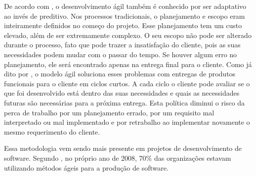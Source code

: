 De acordo com \cite{soares}, o desenvolvimento ágil também é conhecido por ser adaptativo ao invés de preditivo. Nos processos tradicionais, o planejamento e escopo eram inteiramente definidos no começo do projeto. Esse planejamento tem um custo elevado, além de ser extremamente complexo. O seu escopo não pode ser alterado durante o processo, fato que pode trazer a insatisfação do cliente, pois as suas necessidades podem mudar com o passar do tempo. Se houver algum erro no planejamento, ele será encontrado apenas na entrega final para o cliente. Como já dito por \cite{pressman2009engenharia}, o modelo ágil soluciona esses problemas com entregas de produtos funcionais para o cliente em ciclos curtos. A cada ciclo o cliente pode avaliar se o que foi desenvolvido está dentro das suas necessidades e quais as necessidades futuras são necessárias para a próxima entrega. Esta política diminui o risco da perca de trabalho por um planejamento errado, por um requisito mal interpretado ou mal implementado e por retrabalho ao implementar novamente o mesmo requerimento do cliente.

Essa metodologia vem sendo mais presente em projetos de desenvolvimento de software. Segundo \cite{thegood}, no próprio ano de 2008, 70\% das organizações estavam utilizando métodos ágeis para a produção de software.
